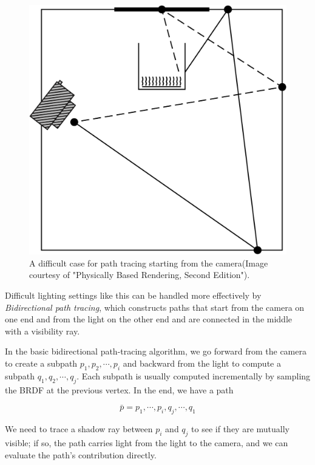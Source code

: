 \begin{figure}
\sidecaption
	\includegraphics[width=.65\textwidth]{graphics/gi/path-9}
	\caption{A difficult case for path tracing starting from the camera(Image courtesy of "Physically Based Rendering, Second Edition").}
	\label{f:bid-tracing}
\end{figure}

Difficult lighting settings like this can be handled more effectively by \textit{Bidirectional path tracing}, which constructs paths that start from the camera on one end and from the light on the other end and are connected in the middle with a visibility ray.

In the basic bidirectional path-tracing algorithm, we go forward from the camera to create a subpath $p_1,p_2,\cdots ,p_i$ and backward from the light to compute a subpath $q_1,q_2,\cdots ,q_j$. Each subpath is usually computed incrementally by sampling the BRDF at the previous vertex. In the end, we have a path

\begin{equation*}
	\bar{p}=p_1,\cdots ,p_i,q_j,\cdots,q_1
\end{equation*}

We need to trace a shadow ray between $p_i$ and $q_j$ to see if they are mutually visible; if so, the path carries light from the light to the camera, and we can evaluate the path's contribution directly.

